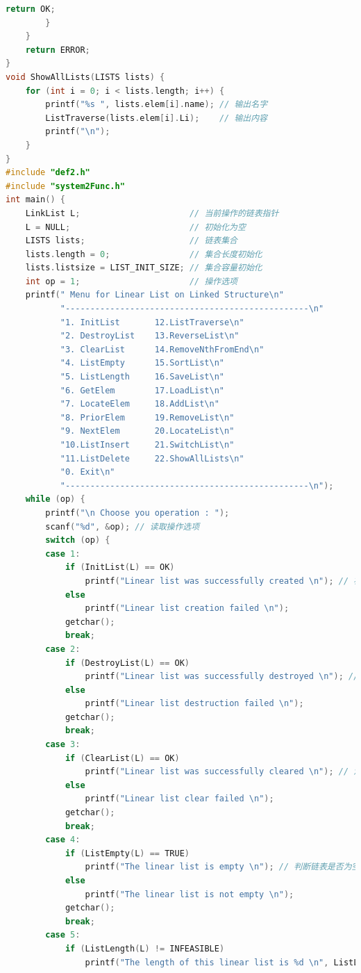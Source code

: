 \documentclass[supercite]{Experimental_Report}
\theoremstyle{definition}
\begin{document}
\begin{lstlisting}[language=c]
            return OK;
        }
    }
    return ERROR;
}
void ShowAllLists(LISTS lists) {
    for (int i = 0; i < lists.length; i++) {
        printf("%s ", lists.elem[i].name); // 输出名字
        ListTraverse(lists.elem[i].Li);    // 输出内容
        printf("\n");
    }
}
#include "def2.h"
#include "system2Func.h"
int main() {
    LinkList L;                      // 当前操作的链表指针
    L = NULL;                        // 初始化为空
    LISTS lists;                     // 链表集合
    lists.length = 0;                // 集合长度初始化
    lists.listsize = LIST_INIT_SIZE; // 集合容量初始化
    int op = 1;                      // 操作选项
    printf(" Menu for Linear List on Linked Structure\n"
           "-------------------------------------------------\n"
           "1. InitList       12.ListTraverse\n"
           "2. DestroyList    13.ReverseList\n"
           "3. ClearList      14.RemoveNthFromEnd\n"
           "4. ListEmpty      15.SortList\n"
           "5. ListLength     16.SaveList\n"
           "6. GetElem        17.LoadList\n"
           "7. LocateElem     18.AddList\n"
           "8. PriorElem      19.RemoveList\n"
           "9. NextElem       20.LocateList\n"
           "10.ListInsert     21.SwitchList\n"
           "11.ListDelete     22.ShowAllLists\n"
           "0. Exit\n"
           "-------------------------------------------------\n");
    while (op) {
        printf("\n Choose you operation : ");
        scanf("%d", &op); // 读取操作选项
        switch (op) {
        case 1:
            if (InitList(L) == OK)
                printf("Linear list was successfully created \n"); // 初始化链表
            else
                printf("Linear list creation failed \n");
            getchar();
            break;
        case 2:
            if (DestroyList(L) == OK)
                printf("Linear list was successfully destroyed \n"); // 销毁链表
            else
                printf("Linear list destruction failed \n");
            getchar();
            break;
        case 3:
            if (ClearList(L) == OK)
                printf("Linear list was successfully cleared \n"); // 清空链表
            else
                printf("Linear list clear failed \n");
            getchar();
            break;
        case 4:
            if (ListEmpty(L) == TRUE)
                printf("The linear list is empty \n"); // 判断链表是否为空
            else
                printf("The linear list is not empty \n");
            getchar();
            break;
        case 5:
            if (ListLength(L) != INFEASIBLE)
                printf("The length of this linear list is %d \n", ListLength(L)); // 输出链表长度

\end{lstlisting}
\end{document}
